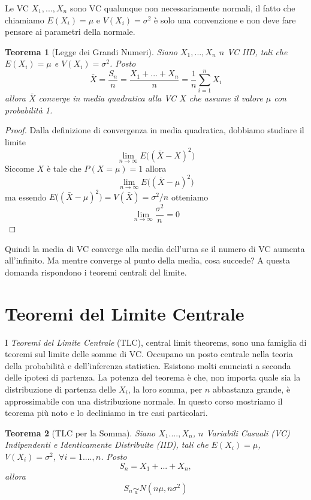 \documentclass[
  11pt,
]{book}
\theoremstyle{mytheoremstyle}
\newtheorem{theorem}{Teorema}[section]
\theoremstyle{mydefstyle}
\newenvironment{att}
  {
\begin{tcolorbox}[enhanced,arc=0.1mm,boxrule=1pt,colback=white,colframe=ared,title=\bf\small \fontfamily{lmss}\selectfont \faExclamationTriangle \hspace{.5 cm} Attenzione,drop fuzzy shadow]
}{
\end{tcolorbox}
  }
\begin{document}
\begin{att}
Le VC \(X_1,...,X_n\) sono VC qualunque non necessariamente normali, il
fatto che chiamiamo \(E(X_i)=\mu\) e \(V(X_i)=\sigma^2\) è solo una
convenzione e non deve fare pensare ai parametri della normale.

\end{att}

\begin{theorem}[Legge dei Grandi Numeri]
Siano \(X_1,...,X_n\) \(n\) VC IID, tali che \(E(X_i)=\mu\) e
\(V(X_i)=\sigma^2\). Posto
\[\bar X= \frac{S_n}n =\frac{X_1+...+X_n}n=\frac 1n\sum_{i=1}^nX_i\]
allora \(\bar X\) converge in media quadratica alla VC \(X\) che assume il
valore \(\mu\) con probabilità 1.
\end{theorem}

\begin{proof}
Dalla definizione di convergenza in media quadratica, dobbiamo studiare
il limite \[\lim_{n\to\infty}E\big((\bar X-X)^2\big)\] Siccome \(X\) è
tale che \(P(X=\mu)=1\) allora
\[\lim_{n\to\infty}E\big((\bar X-\mu)^2\big)\] ma essendo
\(E\big((\bar X-\mu)^2\big)=V(\bar X)=\sigma^2/n\) otteniamo
\[\lim_{n\to\infty}\frac {\sigma^2}n=0\]
\end{proof}

Quindi la media di VC converge alla media dell'urna se il numero di VC
aumenta all'infinito. Ma mentre converge al punto della media, cosa
succede? A questa domanda rispondono i teoremi centrali del limite.

\section{Teoremi del Limite Centrale}\label{teoremi-del-limite-centrale}

I \emph{Teoremi del Limite Centrale} (TLC), central limit theorems, sono una
famiglia di teoremi sul limite delle somme di VC. Occupano un posto
centrale nella teoria della probabilità e dell'inferenza statistica.
Esistono molti enunciati a seconda delle ipotesi di partenza.
La potenza del teorema è che, non importa quale sia la
distribuzione di partenza delle \(X_i\), la loro somma, per \(n\) abbastanza
grande, è approssimabile con una distribuzione normale.
In questo corso mostriamo il teorema più noto e lo decliniamo in tre casi
particolari.

\begin{info}

\begin{theorem}[TLC per la Somma]
Siano \(X_1....,X_n\), \(n\) Variabili Casuali (VC) Indipendenti e
Identicamente Distribuite (IID), tali che \(E(X_i)=\mu\),
\(V(X_i)=\sigma^2\), \(\forall i=1....,n\). Posto \[S_n=X_1+...+X_n,\]
allora \[S_n\operatorname*{\sim}_{a} N\left(n\mu,n\sigma^2\right)\]
\end{theorem}

\end{info}
\end{document}
